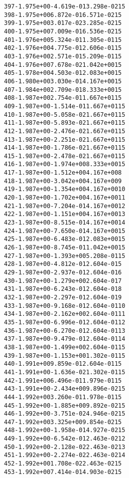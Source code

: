 \begin{alltt}
 397  -1.975e+00  -4.619e-01   3.298e-02   15
 398  -1.975e+00   6.872e-01   6.571e-02   15
 399  -1.975e+00   3.017e-02   3.285e-02   15
 400  -1.975e+00   7.009e-01   6.536e-02   15
 401  -1.976e+00   5.324e-01   1.305e-01   15
 402  -1.976e+00   4.775e-01   2.606e-01   15
 403  -1.976e+00   2.571e-01   5.209e-01   15
 404  -1.976e+00   7.678e-02   1.042e+00   15
 405  -1.978e+00   4.503e-01   2.083e+00   15
 406  -1.980e+00   3.030e-01   4.167e+00   15
 407  -1.984e+00   2.709e-01   8.333e+00   15
 408  -1.987e+00   2.754e-01   1.667e+01   15
 409  -1.987e+00  -1.514e-01   1.667e+01   15
 410  -1.987e+00  -5.058e-02   1.667e+01   15
 411  -1.987e+00  -5.893e-02   1.667e+01   15
 412  -1.987e+00  -2.476e-02   1.667e+01   15
 413  -1.987e+00  -2.251e-02   1.667e+01   15
 414  -1.987e+00  -1.786e-02   1.667e+01   15
 415  -1.987e+00  -2.478e-02   1.667e+01   15
 416  -1.987e+00  -1.974e+00   8.333e+00   15
 417  -1.987e+00  -1.512e+00   4.167e+00    8
 418  -1.987e+00  -3.042e+00   4.167e+00    9
 419  -1.987e+00  -1.354e+00   4.167e+00   10
 420  -1.987e+00  -1.702e+00   4.167e+00   11
 421  -1.987e+00  -7.204e-01   4.167e+00   12
 422  -1.987e+00  -1.151e+00   4.167e+00   13
 423  -1.987e+00  -8.515e-01   4.167e+00   14
 424  -1.987e+00  -7.650e-01   4.167e+00   15
 425  -1.987e+00  -6.483e-01   2.083e+00   15
 426  -1.987e+00  -8.745e-01   1.042e+00   15
 427  -1.987e+00  -1.393e+00   5.208e-01   15
 428  -1.987e+00  -4.812e-01   2.604e-01    5
 429  -1.987e+00  -2.937e-01   2.604e-01    6
 430  -1.987e+00  -1.279e+00   2.604e-01    7
 431  -1.987e+00  -6.243e-01   2.604e-01    8
 432  -1.987e+00  -2.297e-01   2.604e-01    9
 433  -1.987e+00  -9.168e-01   2.604e-01   10
 434  -1.987e+00  -2.162e+00   2.604e-01   11
 435  -1.987e+00  -6.996e-01   2.604e-01   12
 436  -1.987e+00  -6.270e-01   2.604e-01   13
 437  -1.987e+00  -9.479e-01   2.604e-01   14
 438  -1.987e+00  -1.499e+00   2.604e-01   15
 439  -1.987e+00  -1.153e+00   1.302e-01   15
 440  -1.991e+00   9.859e-01   2.604e-01   15
 441  -1.991e+00  -1.636e-02   1.302e-01   15
 442  -1.991e+00   6.496e-01   1.979e-01   15
 443  -1.991e+00  -2.434e+00   9.896e-02   15
 444  -1.992e+00   3.260e-01   1.978e-01   15
 445  -1.992e+00  -1.885e+00   9.892e-02   15
 446  -1.992e+00  -3.751e-02   4.946e-02   15
 447  -1.992e+00   3.325e+00   9.854e-02   15
 448  -1.992e+00  -1.958e-01   4.927e-02   15
 449  -1.992e+00  -6.542e-01   2.463e-02   12
 450  -1.992e+00  -2.128e-02   2.463e-02   13
 451  -1.992e+00  -2.274e-02   2.463e-02   14
 452  -1.992e+00   1.708e-02   2.463e-02   15
 453  -1.992e+00   7.414e-01   4.903e-02   15

\end{alltt}
